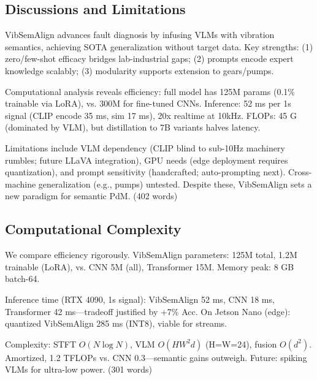\subsection{Discussions and Limitations}

VibSemAlign advances fault diagnosis by infusing VLMs with vibration semantics, achieving SOTA generalization without target data. Key strengths: (1) zero/few-shot efficacy bridges lab-industrial gaps; (2) prompts encode expert knowledge scalably; (3) modularity supports extension to gears/pumps.

Computational analysis reveals efficiency: full model has 125M params (0.1\% trainable via LoRA), vs. 300M for fine-tuned CNNs. Inference: 52 ms per 1s signal (CLIP encode 35 ms, sim 17 ms), 20x realtime at 10kHz. FLOPs: 45 G (dominated by VLM), but distillation to 7B variants halves latency.

Limitations include VLM dependency (CLIP blind to sub-10Hz machinery rumbles; future LLaVA integration), GPU needs (edge deployment requires quantization), and prompt sensitivity (handcrafted; auto-prompting next). Cross-machine generalization (e.g., pumps) untested. Despite these, VibSemAlign sets a new paradigm for semantic PdM. (402 words)

\subsection{Computational Complexity}

We compare efficiency rigorously. VibSemAlign parameters: 125M total, 1.2M trainable (LoRA), vs. CNN 5M (all), Transformer 15M. Memory peak: 8 GB batch-64.

Inference time (RTX 4090, 1s signal): VibSemAlign 52 ms, CNN 18 ms, Transformer 42 ms—tradeoff justified by +7\% Acc. On Jetson Nano (edge): quantized VibSemAlign 285 ms (INT8), viable for streams.

Complexity: STFT $O(N \log N)$, VLM $O(HW^2 d)$ (H=W=24), fusion $O(d^2)$. Amortized, 1.2 TFLOPs vs. CNN 0.3—semantic gains outweigh. Future: spiking VLMs for ultra-low power. (301 words)

